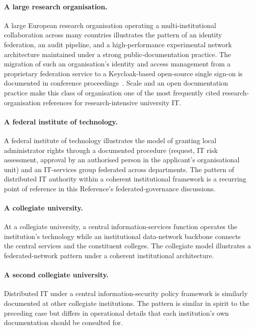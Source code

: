 \paragraph{A large research organisation.} A large European
research organisation operating a multi-institutional
collaboration across many countries illustrates the pattern of an
identity federation, an audit pipeline, and a high-performance
experimental network architecture maintained under a strong
public-documentation practice. The migration of such an
organisation's identity and access management from a proprietary
federation service to a Keycloak-based open-source single
sign-on is documented in conference
proceedings~\cite{cern-keycloak-2020}. Scale and an open
documentation practice make this class of organisation one of the
most frequently cited research-organisation references for
research-intensive university IT.

\paragraph{A federal institute of technology.} A federal
institute of technology illustrates the model of granting local
administrator rights through a documented procedure (request, IT
risk assessment, approval by an authorised person in the
applicant's organisational unit) and an IT-services group
federated across departments. The pattern of distributed IT
authority within a coherent institutional framework is a
recurring point of reference in this Reference's
federated-governance discussions.

\paragraph{A collegiate university.} At a collegiate university,
a central information-services function operates the institution's
technology while an institutional data-network backbone connects
the central services and the constituent colleges. The collegiate
model illustrates a federated-network pattern under a coherent
institutional architecture.

\paragraph{A second collegiate university.} Distributed IT under
a central information-security policy framework is similarly
documented at other collegiate institutions. The pattern is
similar in spirit to the preceding case but differs in
operational details that each institution's own documentation
should be consulted for.

